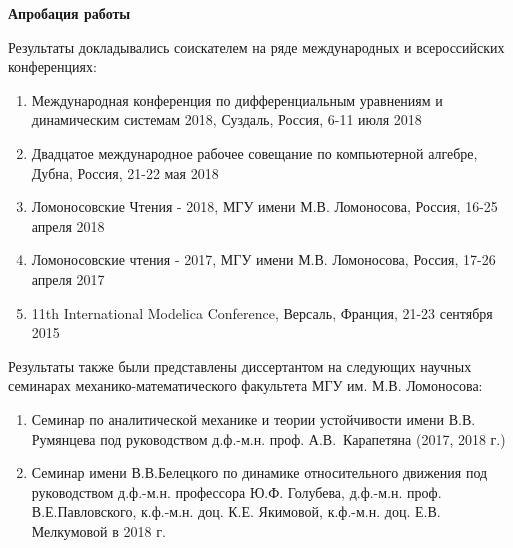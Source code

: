 
\textbf{Апробация работы}

Результаты докладывались соискателем на ряде международных и всероссийских конференциях:
\begin{enumerate}
    \item Международная конференция по дифференциальным уравнениям и динамическим системам 2018, Суздаль, Россия, 6-11 июля 2018
    \item Двадцатое международное рабочее совещание по компьютерной алгебре, Дубна, Россия, 21-22 мая 2018
    \item Ломоносовские Чтения - 2018, МГУ имени М.В. Ломоносова, Россия, 16-25 апреля 2018
    \item Ломоносовские чтения - 2017, МГУ имени М.В. Ломоносова, Россия, 17-26 апреля 2017
    \item 11th International Modelica Conference, Версаль, Франция, 21-23 сентября 2015
\end{enumerate}
Результаты также были представлены диссертантом на следующих научных семинарах механико-математического факультета МГУ им. М.В. Ломоносова:
\begin{enumerate}
    \item Семинар по аналитической механике и теории устойчивости имени В.В. Румянцева под руководством д.ф.-м.н. проф. А.В.~Карапетяна (2017, 2018 г.)
    \item Семинар имени В.В.Белецкого по динамике относительного движения под руководством д.ф.-м.н. профессора Ю.Ф. Голубева, д.ф.-м.н. проф. В.Е.Пав\-лов\-ского, к.ф.-м.н. доц. К.Е. Якимовой, к.ф.-м.н. доц. Е.В. Мелкумовой в 2018 г.
\end{enumerate}
